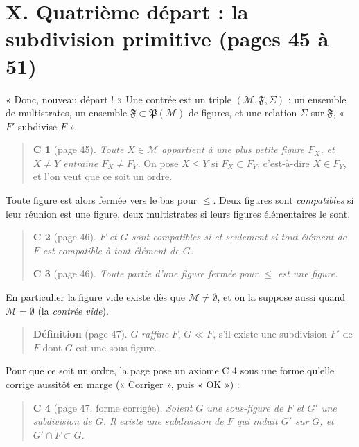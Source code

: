 \documentclass[11pt,a4paper]{article}
\begin{document}
\section*{X. Quatrième départ : la subdivision primitive (pages 45 à 51)}

« Donc, nouveau départ ! » Une contrée est un triple $(\mathcal{M}, \mathfrak{F},
\Sigma)$ : un ensemble de multistrates, un ensemble $\mathfrak{F} \subset
\mathfrak{P}(\mathcal{M})$ de figures, et une relation $\Sigma$ sur
$\mathfrak{F}$, « $F'$ subdivise $F$ ».

\begin{quote}
\textbf{C 1} (page 45). \emph{Toute $X \in \mathcal{M}$ appartient à une plus
petite figure $F_{X}$, et $X \neq Y$ entraîne $F_{X} \neq F_{Y}$.} On pose
$X \leq Y$ si $F_{X} \subset F_{Y}$, c'est-à-dire $X \in F_{Y}$, et l'on veut
que ce soit un ordre.
\end{quote}

Toute figure est alors fermée vers le bas pour $\leq$. Deux figures sont
\emph{compatibles} si leur réunion est une figure, deux multistrates si leurs
figures élémentaires le sont.

\begin{quote}
\textbf{C 2} (page 46). \emph{$F$ et $G$ sont compatibles si et seulement si
tout élément de $F$ est compatible à tout élément de $G$.}

\textbf{C 3} (page 46). \emph{Toute partie d'une figure fermée pour $\leq$ est
une figure.}
\end{quote}

En particulier la figure vide existe dès que $\mathcal{M} \neq \emptyset$, et
on la suppose aussi quand $\mathcal{M} = \emptyset$ (la \emph{contrée vide}).

\begin{quote}
\textbf{Définition} (page 47). $G$ \emph{raffine} $F$, $G \ll F$, s'il existe une
subdivision $F'$ de $F$ dont $G$ est une sous-figure.
\end{quote}

Pour que ce soit un ordre, la page pose un axiome C 4 sous une forme qu'elle
corrige aussitôt en marge (« Corriger », puis « OK ») :

\begin{quote}
\textbf{C 4} (page 47, forme corrigée). \emph{Soient $G$ une sous-figure de $F$
et $G'$ une subdivision de $G$. Il existe une subdivision de $F$ qui induit
$G'$ sur $G$, et $G' \cap F \subset G$.}
\end{quote}
\end{document}

